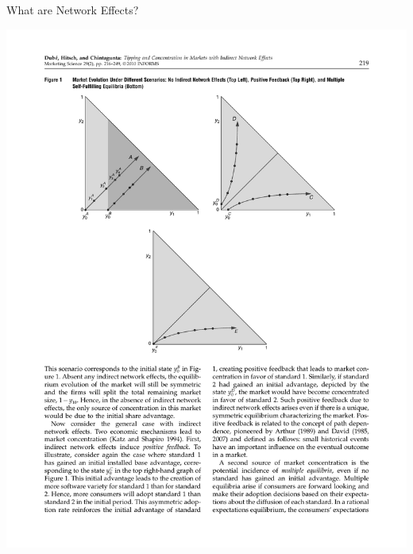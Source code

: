 \documentclass[xcolor=pdftex,dvipsnames,table,mathserif]{beamer}
\begin{document}
\begin{frame}{What are Network Effects?}
\begin{center}
\includegraphics[scale=0.5]{resources/triangles.pdf}
\end{center}
\end{frame}
\end{document}
